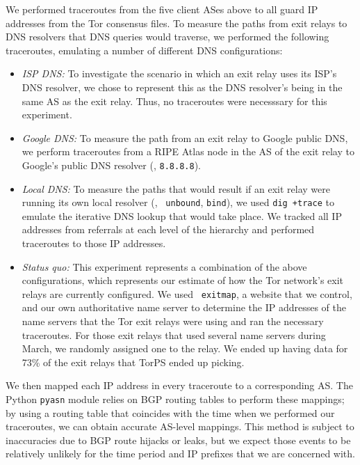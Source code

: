 We performed traceroutes from the five client ASes above to all guard IP
      addresses from the Tor consensus files. To measure the paths from
      exit relays to DNS resolvers that DNS queries would traverse, we
      performed the following traceroutes, emulating a number of
      different DNS configurations:
\begin{itemize}
    \item \emph{ISP DNS:} To investigate the scenario in which an exit 
      relay uses its ISP's DNS resolver, we chose to represent this as 
      the DNS resolver's being in the same AS as the exit relay. 
      Thus, no traceroutes were necesssary for this experiment. 

    \item \emph{Google DNS:} To measure the path from an exit relay to
      Google public DNS, we perform traceroutes from a RIPE Atlas node
      in the AS of the exit relay to Google's public DNS resolver (\ie,
      {\tt 8.8.8.8}).

    \item \emph{Local DNS:} To measure the paths that would result if an
      exit relay were running its own local resolver (\eg, {\tt
        unbound}, {\tt bind}), we used {\tt dig +trace} to emulate the
      iterative DNS lookup that would take place. We tracked all IP
      addresses from referrals at each level of the hierarchy and
      performed traceroutes to those IP addresses.

    \item \emph{Status quo:} This experiment represents a combination of
      the above configurations, which represents our estimate of how the
      Tor network's exit relays are currently configured. We used {\tt
        exitmap}, a website that we control, and our own authoritative
      name server to determine the IP addresses of the name servers that
      the Tor exit relays were using and ran the necessary traceroutes. 
      For those exit relays that used several name servers during March, 
      we randomly assigned one to the relay. We ended up having data 
      for 73\% of the exit relays that TorPS ended up picking.
\end{itemize}
\noindent
We then mapped each IP address in every traceroute to a corresponding
AS.  The Python {\tt pyasn} module relies on BGP routing tables to
perform these mappings; by using a routing table that coincides with the
time when we performed our traceroutes, we can obtain accurate AS-level
mappings.  This method is subject to inaccuracies due to BGP route
hijacks or leaks, but we expect those events to be relatively unlikely
for the time period and IP prefixes that we are concerned with.

